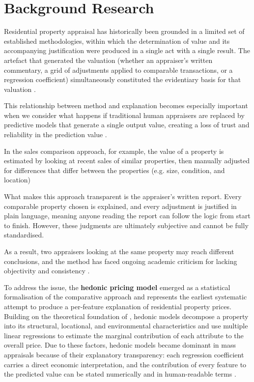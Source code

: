 \chapter{Background Research}\label{ch:Background}

Residential property appraisal has historically been grounded in a limited set of established methodologies, within which the determination of value and its accompanying justification were produced in a single act with a single result. The artefact that generated the valuation (whether an appraiser's written commentary, a grid of adjustments applied to comparable transactions, or a regression coefficient) simultaneously constituted the evidentiary basis for that valuation \parencite{Pagourtzi2003}.

This relationship between method and explanation becomes especially important when we consider what happens if traditional human appraisers are replaced by predictive models that generate a single output value, creating a loss of trust and reliability in the prediction value \parencite{Pagourtzi2003}.

In the sales comparison approach, for example, the value of a property is estimated by looking at recent sales of similar properties, then manually adjusted for differences that differ between the properties (e.g. size, condition, and location) \parencite{Pagourtzi2003}

What makes this approach transparent is the appraiser's written report. Every comparable property chosen is explained, and every adjustment is justified in plain language, meaning anyone reading the report can follow the logic from start to finish. However, these judgments are ultimately subjective and cannot be fully standardised.

As a result, two appraisers looking at the same property may reach different conclusions, and the method has faced ongoing academic criticism for lacking objectivity and consistency \parencite{Pagourtzi2003}.

To address the issue, the \textbf{hedonic pricing model} emerged as a statistical formalisation of the comparative approach and represents the earliest systematic attempt to produce a per-feature explanation of residential property prices. Building on the theoretical foundation of \textcite{Rosen1974}, hedonic models decompose a property into its structural, locational, and environmental characteristics and use multiple linear regressions to estimate the marginal contribution of each attribute to the overall price. Due to these factors, hedonic models became dominant in mass appraisals because of their explanatory transparency: each regression coefficient carries a direct economic interpretation, and the contribution of every feature to the predicted value can be stated numerically and in human-readable terms \parencite{Wing2003}.

